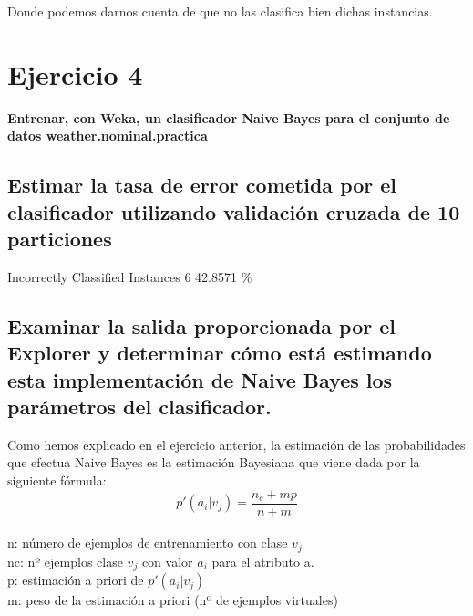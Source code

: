 \documentclass{article}
\begin{document}
Donde podemos darnos cuenta de que no las clasifica bien dichas instancias. \\

\newpage

\section{Ejercicio 4}

\textbf{Entrenar, con Weka, un clasificador Naive Bayes para el conjunto de datos
weather.nominal.practica}

\vspace{1cm}

\subsection{Estimar la tasa de error cometida por el clasificador utilizando validación cruzada de 10 particiones}

	\hspace{1cm}Incorrectly Classified Instances         \hspace{0.5cm} 6  \hspace{0.5cm}             42.8571 \% 
	
\vspace{1cm}
	
\subsection{Examinar la salida proporcionada por el Explorer y determinar cómo está estimando
esta implementación de Naive Bayes los parámetros del clasificador.}

\hspace{1cm} Como hemos explicado en el ejercicio anterior, la estimación de las probabilidades que efectua Naive Bayes es la estimación Bayesiana que viene dada por la siguiente fórmula: \\

$$ p'(a_i | v_j) = \frac{n_c + mp}{n + m}$$ \\

n: número de ejemplos de entrenamiento con clase $v_j$\\

nc: nº ejemplos clase $v_j$ con valor $a_i$ para el atributo a.\\

p: estimación a priori de $p'(a_i | v_j)$ \\

m: peso de la estimación a priori (nº de ejemplos virtuales)\\
\end{document}
